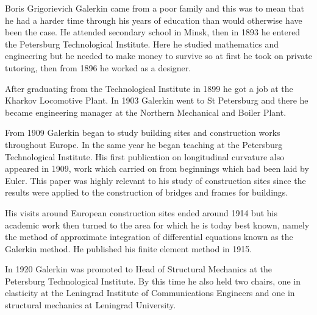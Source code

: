 
Boris Grigorievich Galerkin came from a poor family and this was to mean that he had a harder time through his years of education than would otherwise have been the case. He attended secondary school in Minsk, then in 1893 he entered the Petersburg Technological Institute. Here he studied mathematics and engineering but he needed to make money to survive so at first he took on private tutoring, then from 1896 he worked as a designer. 

After graduating from the Technological Institute in 1899 he got a job at the Kharkov Locomotive Plant. In 1903 Galerkin went to St Petersburg and there he became engineering manager at the Northern Mechanical and Boiler Plant. 

From 1909 Galerkin began to study building sites and construction works throughout Europe. In the same year he began teaching at the Petersburg Technological Institute. His first publication on longitudinal curvature also appeared in 1909, work which carried on from beginnings which had been laid by Euler. This paper was highly relevant to his study of construction sites since the results were applied to the construction of bridges and frames for buildings. 

His visits around European construction sites ended around 1914 but his academic work then turned to the area for which he is today best known, namely the method of approximate integration of differential equations known as the Galerkin method. He published his finite element method in 1915. 

In 1920 Galerkin was promoted to Head of Structural Mechanics at the Petersburg Technological Institute. By this time he also held two chairs, one in elasticity at the Leningrad Institute of Communications Engineers and one in structural mechanics at Leningrad University. 

